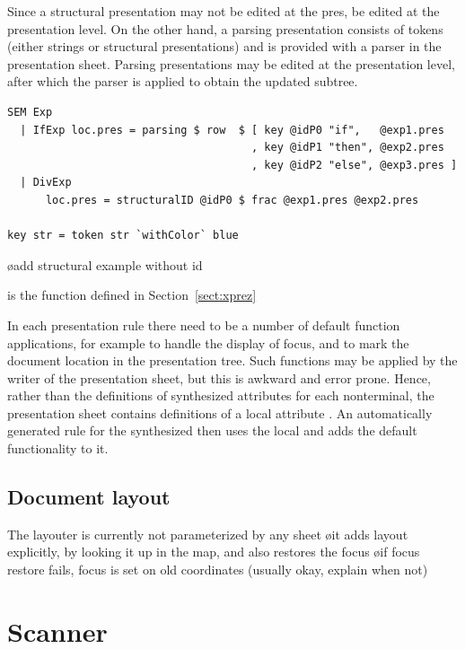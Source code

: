\documentclass[12pt]{article}
\begin{document}
Since a structural presentation may not be edited at the pres,  be edited at the presentation level.
On the other hand, a parsing presentation consists of tokens (either strings or structural presentations) and is provided with a parser in the presentation sheet. Parsing presentations may be edited at the presentation level, after which the parser is applied to obtain the updated subtree.


\begin{footnotesize}
\begin{verbatim}
SEM Exp
  | IfExp loc.pres = parsing $ row  $ [ key @idP0 "if",   @exp1.pres
                                      , key @idP1 "then", @exp2.pres
                                      , key @idP2 "else", @exp3.pres ]
  | DivExp
      loc.pres = structuralID @idP0 $ frac @exp1.pres @exp2.pres
                  
key str = token str `withColor` blue 
\end{verbatim}%
\end{footnotesize} %

\bl
\o add structural example without id
\el

 is the function defined in Section~\ref{sect:xprez}

In each presentation rule there need to be a number of default function applications, for example to handle the display of focus, and to mark the document location in the presentation tree. Such functions may be applied by the writer of the presentation sheet, but this is awkward and error prone. Hence, rather than the definitions of synthesized attributes  for each nonterminal, the presentation sheet contains definitions of a local attribute . An automatically generated rule for the synthesized  then uses the local  and adds the default functionality to it.

\subsection{Document layout}

The layouter is currently not parameterized by any sheet
\bl
\o it adds layout explicitly, by looking it up in the map, and also restores the focus
\o if focus restore fails, focus is set on old coordinates (usually okay, explain when not)
\el


%
\section{Scanner}
%
\end{document}
